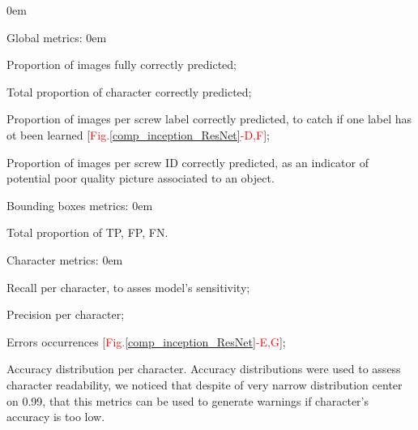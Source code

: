 \documentclass[12pt, french, a4paper]{article} %
\let\tempone\itemize
\let\temptwo\enditemize
\renewenvironment{itemize}{\tempone\addtolength{\itemsep}{-0.3\baselineskip}}{\temptwo}
\begin{document}
\begin{itemize}
\itemsep0em 
 \item Global metrics:
   \begin{itemize}
   \itemsep0em 
    \item Proportion of images fully correctly predicted;
    \item Total proportion of character correctly predicted;
    \item Proportion of images per screw label correctly predicted, to catch if one label has ot been learned [\textcolor{red}{Fig.}\ref{comp_inception_ResNet}\textcolor{red}{-D,F}];
    \item Proportion of images per screw ID correctly predicted, as an indicator of potential poor quality picture associated to an object.
   \end{itemize}
 \item Bounding boxes metrics: 
 \begin{itemize}
 \itemsep0em 
  \item Total proportion of \gls{TP}, \gls{FP}, \gls{FN}.
 \end{itemize}
  \item Character metrics:
  \begin{itemize}
  \itemsep0em 
   \item Recall per character, to asses model's sensitivity;
   \item Precision per character;
   \item Errors occurrences [\textcolor{red}{Fig.}\ref{comp_inception_ResNet}\textcolor{red}{-E,G}];
   \item Accuracy distribution per character.
  \end{itemize}
\end{itemize}
Accuracy distributions were used to assess character readability, we noticed that despite of very narrow distribution center on 0.99, that this metrics can be used to generate warnings if character's accuracy is too low. 

\end{document}
